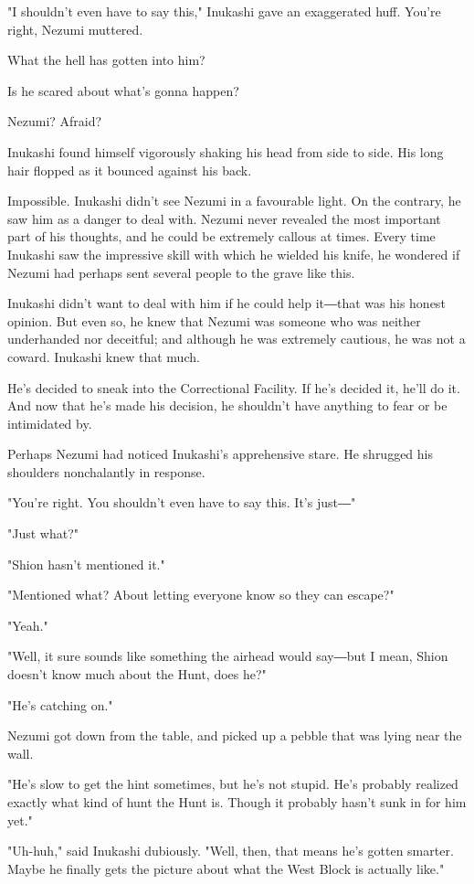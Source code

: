"I shouldn't even have to say this," Inukashi gave an exaggerated huff.
You're right, Nezumi muttered.

What the hell has gotten into him?

Is he scared about what's gonna happen?

Nezumi? Afraid?

Inukashi found himself vigorously shaking his head from side to side.
His long hair flopped as it bounced against his back.

Impossible. Inukashi didn't see Nezumi in a favourable light. On the
contrary, he saw him as a danger to deal with. Nezumi never revealed the
most important part of his thoughts, and he could be extremely callous
at times. Every time Inukashi saw the impressive skill with which he
wielded his knife, he wondered if Nezumi had perhaps sent several people
to the grave like this.

Inukashi didn't want to deal with him if he could help it―that was his
honest opinion. But even so, he knew that Nezumi was someone who was
neither underhanded nor deceitful; and although he was extremely
cautious, he was not a coward. Inukashi knew that much.

He's decided to sneak into the Correctional Facility. If he's decided
it, he'll do it. And now that he's made his decision, he shouldn't have
anything to fear or be intimidated by.

Perhaps Nezumi had noticed Inukashi's apprehensive stare. He shrugged
his shoulders nonchalantly in response.

"You're right. You shouldn't even have to say this. It's just―"

"Just what?"

"Shion hasn't mentioned it."

"Mentioned what? About letting everyone know so they can escape?"

"Yeah."

"Well, it sure sounds like something the airhead would say―but I mean,
Shion doesn't know much about the Hunt, does he?"

"He's catching on."

Nezumi got down from the table, and picked up a pebble that was lying
near the wall.

"He's slow to get the hint sometimes, but he's not stupid. He's probably
realized exactly what kind of hunt the Hunt is. Though it probably
hasn't sunk in for him yet."

"Uh-huh," said Inukashi dubiously. "Well, then, that means he's gotten
smarter. Maybe he finally gets the picture about what the West Block is
actually like."

